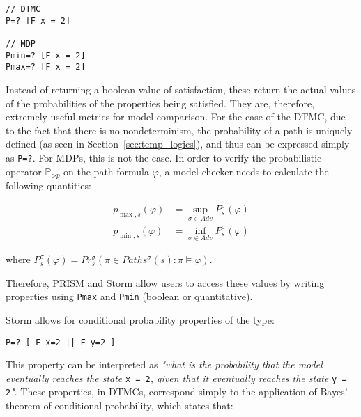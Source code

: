 \begin{minipage}{\linewidth}
{\vspace{1em}
\begin{lstlisting}
// DTMC
P=? [F x = 2]

// MDP
Pmin=? [F x = 2]
Pmax=? [F x = 2]
\end{lstlisting}
}
\end{minipage}

Instead of returning a boolean value of satisfaction, these return the actual values of the probabilities of the properties being satisfied. They are, therefore, extremely useful metrics for model comparison. For the case of the DTMC, due to the fact that there is no nondeterminism, the probability of a path is uniquely defined (as seen in Section~\ref{sec:temp_logics}), and thus can be expressed simply as \texttt{P=?}. For MDPs, this is not the case. In order to verify the probabilistic operator $\mathbb{P}_{\triangleright p}$ on the path formula $\varphi$, a model checker needs to calculate the following quantities:

\begin{equation}
\begin{aligned}
	p_{\max, s} (\varphi) & = \sup_{\sigma \in Adv} P^{\sigma}_s (\varphi) \\
	p_{\min, s} (\varphi) & = \inf_{\sigma \in Adv} P^{\sigma}_s (\varphi)
\end{aligned}
\end{equation}

where $P^{\sigma}_s (\varphi) = Pr^{\sigma}_s (\pi \in Paths^{\sigma}(s): \pi \models \varphi)$.

Therefore, PRISM and Storm allow users to access these values by writing properties using \texttt{Pmax} and \texttt{Pmin} (boolean or quantitative). 

Storm allows for conditional probability properties of the type:

\begin{minipage}{\linewidth}
{\vspace{1em}
\begin{lstlisting}
P=? [ F x=2 || F y=2 ]
\end{lstlisting}
}
\end{minipage}

This property can be interpreted as \textit{"what is the probability that the model eventually reaches the state} \texttt{x = 2}\textit{, given that it eventually reaches the state} \texttt{y = 2}\textit{"}. These properties, in DTMCs, correspond simply to the application of Bayes' theorem of conditional probability, which states that:

